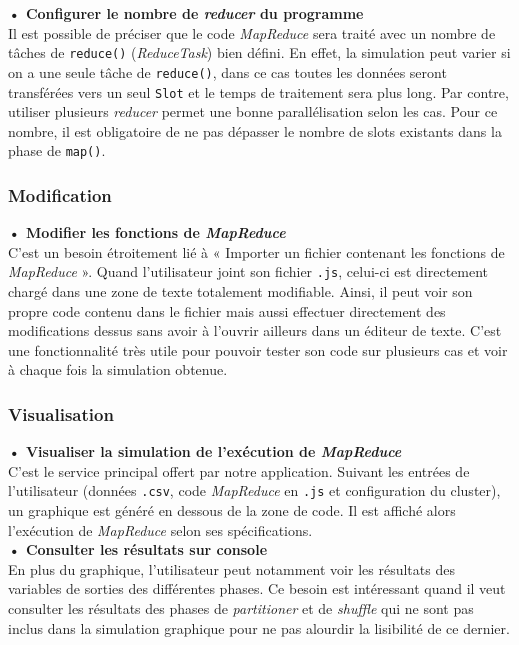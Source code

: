 \textbf{• Configurer le nombre de {\it reducer} du programme\\} Il est possible de préciser que le code {\it MapReduce} sera traité avec un nombre de tâches de {\tt reduce()} ({\it ReduceTask}) bien défini. En effet, la simulation peut varier si on a une seule tâche de {\tt reduce()}, dans ce cas toutes les données seront transférées vers un seul {\tt Slot} et le temps de traitement sera plus long. Par contre, utiliser plusieurs {\it reducer} permet une bonne parallélisation selon les cas. Pour ce nombre, il est obligatoire de ne pas dépasser le nombre de slots existants dans la phase de {\tt map()}.\\

\subsubsection{Modification} 

\textbf{• Modifier les fonctions de {\it MapReduce}\\} C'est un besoin étroitement lié à « Importer un fichier contenant les fonctions de {\it MapReduce} ». Quand l'utilisateur joint son fichier {\tt .js}, celui-ci est directement chargé dans une zone de texte totalement modifiable. Ainsi, il peut voir son propre code contenu dans le fichier mais aussi effectuer directement des modifications dessus sans avoir à l'ouvrir ailleurs dans un éditeur de texte. C'est une fonctionnalité très utile pour pouvoir tester son code sur plusieurs cas et voir à chaque fois la simulation obtenue.  \\

\subsubsection{Visualisation}

\textbf{•  Visualiser la simulation de l'exécution de {\it MapReduce}\\} C'est le service principal offert par notre application. Suivant les entrées de l'utilisateur (données {\tt .csv}, code {\it MapReduce} en {\tt .js} et configuration du cluster), un graphique est généré en dessous de la zone de code. Il est affiché alors l'exécution de {\it MapReduce} selon ses spécifications.\\

\textbf{• Consulter les résultats sur console\\} En plus du graphique, l'utilisateur peut notamment voir les résultats des variables de sorties des différentes phases. Ce besoin est intéressant quand il veut consulter les résultats des phases de {\it partitioner} et de {\it shuffle} qui ne sont pas inclus dans la simulation graphique pour ne pas alourdir la lisibilité de ce dernier.\\


